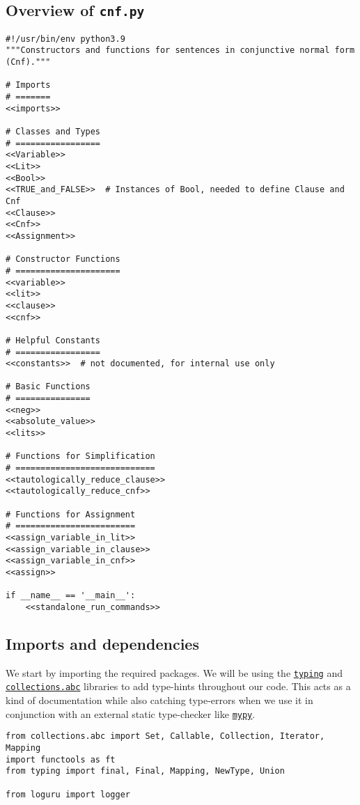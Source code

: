\documentclass[11pt]{article}
\begin{document}
\subsection{Overview of \texttt{cnf.py}}
\label{sec:orgd32c73b}
\begin{verbatim}
#!/usr/bin/env python3.9
"""Constructors and functions for sentences in conjunctive normal form (Cnf)."""

# Imports
# =======
<<imports>>

# Classes and Types
# =================
<<Variable>>
<<Lit>>
<<Bool>>
<<TRUE_and_FALSE>>  # Instances of Bool, needed to define Clause and Cnf
<<Clause>>
<<Cnf>>
<<Assignment>>

# Constructor Functions
# =====================
<<variable>>
<<lit>>
<<clause>>
<<cnf>>

# Helpful Constants
# =================
<<constants>>  # not documented, for internal use only

# Basic Functions
# ===============
<<neg>>
<<absolute_value>>
<<lits>>

# Functions for Simplification
# ============================
<<tautologically_reduce_clause>>
<<tautologically_reduce_cnf>>

# Functions for Assignment
# ========================
<<assign_variable_in_lit>>
<<assign_variable_in_clause>>
<<assign_variable_in_cnf>>
<<assign>>

if __name__ == '__main__':
    <<standalone_run_commands>>
\end{verbatim}

\subsection{Imports and dependencies}
\label{sec:orgb7b05e5}
We start by importing the required packages.  We will be using the \href{https://docs.python.org/3/library/typing.html}{\texttt{typing}} and
\href{https://docs.python.org/3/library/collections.abc.html}{\texttt{collections.abc}} libraries to add type-hints throughout our code.  This acts as
a kind of documentation while also catching type-errors when we use it in
conjunction with an external static type-checker like \href{https://mypy.readthedocs.io/en/stable/}{\texttt{mypy}}.

\begin{verbatim}
from collections.abc import Set, Callable, Collection, Iterator, Mapping
import functools as ft
from typing import final, Final, Mapping, NewType, Union

from loguru import logger
\end{verbatim}
\end{document}
